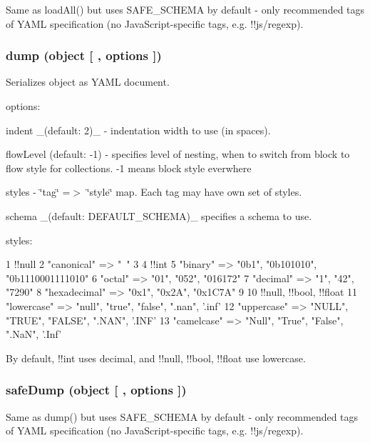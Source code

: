 Same as {\ttfamily load\+All()} but uses {\ttfamily S\+A\+F\+E\+\_\+\+S\+C\+H\+E\+M\+A} by default -\/ only recommended tags of Y\+A\+M\+L specification (no Java\+Script-\/specific tags, e.\+g. {\ttfamily !!js/regexp}).

\subsubsection*{dump (object \mbox{[} , options \mbox{]})}

Serializes {\ttfamily object} as Y\+A\+M\+L document.

options\+:


\begin{DoxyItemize}
\item {\ttfamily indent} \+\_\+(default\+: 2)\+\_\+ -\/ indentation width to use (in spaces).
\item {\ttfamily flow\+Level} (default\+: -\/1) -\/ specifies level of nesting, when to switch from block to flow style for collections. -\/1 means block style everwhere
\item {\ttfamily styles} -\/ \char`\"{}tag\char`\"{} =$>$ \char`\"{}style\char`\"{} map. Each tag may have own set of styles.
\item {\ttfamily schema} \+\_\+(default\+: {\ttfamily D\+E\+F\+A\+U\+L\+T\+\_\+\+S\+C\+H\+E\+M\+A})\+\_\+ specifies a schema to use.
\end{DoxyItemize}

styles\+:


\begin{DoxyCode}
1 !!null
2   "canonical"   => "~"
3 
4 !!int
5   "binary"      => "0b1", "0b101010", "0b1110001111010"
6   "octal"       => "01", "052", "016172"
7   "decimal"     => "1", "42", "7290"
8   "hexadecimal" => "0x1", "0x2A", "0x1C7A"
9 
10 !!null, !!bool, !!float
11   "lowercase"   => "null", "true", "false", ".nan", '.inf'
12   "uppercase"   => "NULL", "TRUE", "FALSE", ".NAN", '.INF'
13   "camelcase"   => "Null", "True", "False", ".NaN", '.Inf'
\end{DoxyCode}


By default, !!int uses {\ttfamily decimal}, and !!null, !!bool, !!float use {\ttfamily lowercase}.

\subsubsection*{safe\+Dump (object \mbox{[} , options \mbox{]})}

Same as {\ttfamily dump()} but uses {\ttfamily S\+A\+F\+E\+\_\+\+S\+C\+H\+E\+M\+A} by default -\/ only recommended tags of Y\+A\+M\+L specification (no Java\+Script-\/specific tags, e.\+g. {\ttfamily !!js/regexp}).

